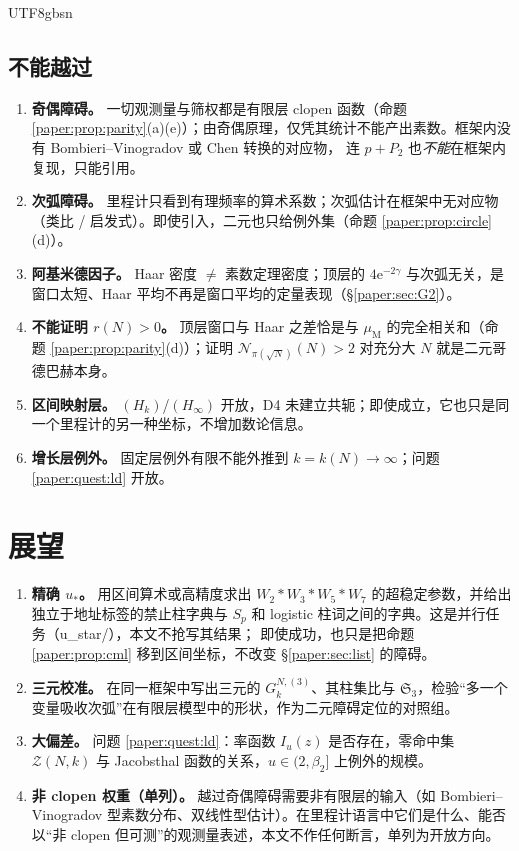 \documentclass[11pt,a4paper]{article}
\newcommand{\Sing}{\mathfrak S}
\newcommand{\Cnt}{\mathcal N}          %
\newcommand{\ust}{u_{*}}               %
\newcommand{\Mob}{\mu_{\mathrm{M}}}    %
\newcommand{\ee}{\mathrm e}
\theoremstyle{plain}
\theoremstyle{definition}
\begin{document}
\begin{CJK}{UTF8}{gbsn}
\subsection{不能越过}
\begin{enumerate}[leftmargin=*]
\item \textbf{奇偶障碍。} 一切观测量与筛权都是有限层 clopen 函数（命题 \ref{paper:prop:parity}(a)(e)）；由奇偶原理，仅凭其统计不能产出素数。框架内没有 Bombieri--Vinogradov 或 Chen 转换的对应物，
连 $p+P_2$ 也\emph{不能}在框架内复现，只能引用。
\item \textbf{次弧障碍。} 里程计只看到有理频率的算术系数；次弧估计在框架中无对应物（类比 / 启发式）。即使引入，二元也只给例外集（命题 \ref{paper:prop:circle}(d)）。
\item \textbf{阿基米德因子。} Haar 密度 $\ne$ 素数定理密度；顶层的 $4\ee^{-2\gamma}$ 与次弧无关，是窗口太短、Haar 平均不再是窗口平均的定量表现（\S\ref{paper:sec:G2}）。
\item \textbf{不能证明 $r(N)>0$。} 顶层窗口与 Haar 之差恰是与 $\Mob$ 的完全相关和（命题 \ref{paper:prop:parity}(d)）；证明 $\Cnt_{\pi(\sqrt N)}(N)>2$ 对充分大 $N$ 就是二元哥德巴赫本身。
\item \textbf{区间映射层。} $(H_k)$/$(H_\infty)$ 开放，D4 未建立共轭；即使成立，它也只是同一个里程计的另一种坐标，不增加数论信息。
\item \textbf{增长层例外。} 固定层例外有限不能外推到 $k=k(N)\to\infty$；问题 \ref{paper:quest:ld} 开放。
\end{enumerate}

\section{展望}\label{paper:sec:outlook}
\begin{enumerate}[leftmargin=*]
\item \textbf{精确 $\ust$。} 用区间算术或高精度求出 $W_2*W_3*W_5*W_7$ 的超稳定参数，并给出独立于地址标签的禁止柱字典与 $S_p$ 和 logistic 柱词之间的字典。这是并行任务（u\_star/），本文不抢写其结果；
即使成功，也只是把命题 \ref{paper:prop:cml} 移到区间坐标，不改变 \S\ref{paper:sec:list} 的障碍。
\item \textbf{三元校准。} 在同一框架中写出三元的 $G_k^{N,(3)}$、其柱集比与 $\Sing_3$，检验“多一个变量吸收次弧”在有限层模型中的形状，作为二元障碍定位的对照组。
\item \textbf{大偏差。} 问题 \ref{paper:quest:ld}：率函数 $I_u(z)$ 是否存在，零命中集 $\mathcal Z(N,k)$ 与 Jacobsthal 函数的关系，$u\in(2,\beta_2]$ 上例外的规模。
\item \textbf{非 clopen 权重（单列）。} 越过奇偶障碍需要非有限层的输入（如 Bombieri--Vinogradov 型素数分布、双线性型估计）。在里程计语言中它们是什么、能否以“非 clopen 但可测”的观测量表述，本文不作任何断言，单列为开放方向。
\end{enumerate}


\end{CJK}
\end{document}
